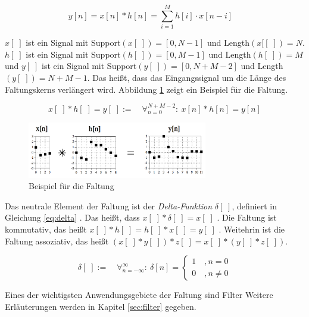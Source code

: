 \begin{equation}
y[n] = x[n] * h[n] = \sum_{i=1}^{M} h[i] \cdot x[n-i] \quad
\label{eq:convolutionSum}
\end{equation}

 $x[\;]$ ist ein Signal mit Support$(x[\;]) = [0,N-1]$ und Length$(x[[\;]) = N$. $h[\;]$ ist ein Signal mit Support$(h[\;]) = [0,M-1]$ und Length$(h[\;]) = M$ und $y[\;]$ ist ein Signal mit Support$(y[\;]) = [0,N+M-2]$ und Length$(y[\;]) = N+M-1$. Das heißt, dass das Eingangssignal um die Länge des Faltungskerns verlängert wird. Abbildung 	\ref{img:convolutionExample} zeigt ein Beispiel für die Faltung.\cite[S. 115-120]{dspGuide}
 
 \begin{equation}
x[\;] *  h[\;] =  y[\;] := \quad \mathop{\forall}_{n = 0}^{N+M-2} :\ x[n] * h[n] = y[n]
 \label{eq:convolutionSum}
 \end{equation}

\begin{figure}[h]
	\centering
	\includegraphics[width=0.7\textwidth]{bilder/convolutionExample.png}
	\caption{Beispiel für die Faltung}
	\label{img:convolutionExample}
\end{figure}

Das neutrale Element der Faltung ist der \emph{Delta-Funktion} $\delta[\;]$, definiert in Gleichung \ref{eq:delta} . Das heißt, dass $x[\;] * \delta[\;] = x[\;]$ . Die Faltung ist kommutativ, das heißt $ x[\;]* h[\;] = h[\;] * x[\;] = y[\;]$ . \cite[S. 107, 113 ]{dspGuide} Weitehrin ist die Faltung assoziativ, das heißt $(x[\;]*y[\;])*z[\;]=x[\;]*(y[\;]*z[\;])$. \cite[S. 133]{dspGuide}

\begin{equation}
\delta [\;] := \quad \mathop{\forall}_{n = -\infty}^{\infty} :\ \delta[n] = 
\begin{cases}
1 \quad , n = 0\\
0 \quad ,  n \neq 0
\label{eq:delta}
\end{cases}
\end{equation}

Eines der wichtigsten Anwendungsgebiete der Faltung sind Filter Weitere Erläuterungen werden in Kapitel \ref{sec:filter} gegeben.


